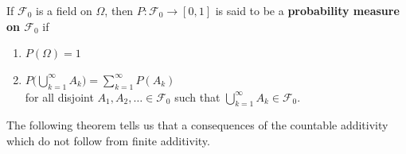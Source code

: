 \begin{definition}
If $\mathcal F_0$ is a field on $\Omega$, then $P:\mathcal F_0\rightarrow [0,1]$ is said to be a {\bf probability measure on $\mathcal F_0$} if
\begin{enumerate}
\item $P(\Omega)=1$
\item $P\bigl( \bigcup_{k=1}^\infty A_k \bigr)=\sum_{k=1}^\infty P(A_k)$ \\ for all disjoint $A_1, A_2,\ldots \in\mathcal F_0$ such that $\bigcup_{k=1}^\infty A_k \in \mathcal F_0$.
\end{enumerate}
\end{definition}

The following theorem tells us that a consequences of the countable additivity which do not follow from finite additivity.


